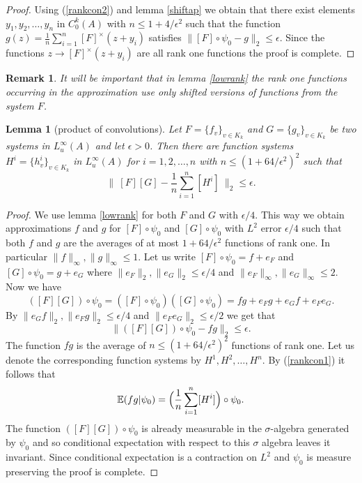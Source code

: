 \documentclass [11pt] {article}
\newtheorem{lemma}{Lemma}[section]
\newtheorem{remark}{Remark}[section]
\begin{document}
\begin{proof} Using (\ref{rankcon2}) and lemma \ref{shiftap} we obtain that there exist elements $y_1,y_2,\dots,y_n$ in $C^k_0(A)$ with $n\leq 1+4/\epsilon^2$ such that the function $g(z)=\frac{1}{n}\sum_{i=1}^n [F]^\times(z+y_i)$ satisfies $\|[F]\circ\psi_0-g\|_2\leq\epsilon$. Since the functions $z\rightarrow [F]^\times(z+y_i)$ are all rank one functions the proof is complete. 
\end{proof}

\begin{remark}\label{aptrans} It will be important that in lemma \ref{lowrank} the rank one functions occurring in the approximation use only shifted versions of functions from the system $F$.
\end{remark}

\begin{lemma}[product of convolutions]\label{prodconv} Let $F=\{f_v\}_{v\in K_k}$ and $G=\{g_v\}_{v\in K_k}$ be two systems in $L^\infty_u(A)$ and let $\epsilon>0$. Then there are function systems $H^i=\{h_v^i\}_{v\in K_k}$ in $L^\infty_u(A)$ for $i=1,2,\dots,n$ with $n\leq (1+64/\epsilon^2)^2$ such that 
$$\|~[F][G]-\frac{1}{n}\sum_{i=1}^n[H^i]~\|_2\leq\epsilon.$$
\end{lemma}

\begin{proof} We use lemma \ref{lowrank} for both $F$ and $G$ with $\epsilon/4$. This way we obtain approximations $f$ and $g$ for $[F]\circ\psi_0$ and $[G]\circ\psi_0$ with $L^2$ error $\epsilon/4$ such that both $f$ and $g$ are the averages of at most $1+64/\epsilon^2$ functions of rank one. In particular $\|f\|_\infty,\|g\|_\infty\leq 1$.  
Let us write $[F]\circ\psi_0=f+e_F$ and $[G]\circ\psi_0=g+e_G$ where $\|e_F\|_2,\|e_G\|_2\leq\epsilon/4$ and $\|e_F\|_\infty,\|e_G\|_\infty\leq 2$. Now we have 
$$([F][G])\circ\psi_0=([F]\circ\psi_0)([G]\circ\psi_0)=fg+e_Fg+e_Gf+e_Fe_G.$$ By
$\|e_Gf\|_2,\|e_Fg\|_2\leq\epsilon/4$ and $\|e_Fe_G\|_2\leq\epsilon/2$ we get that $$\|([F][G])\circ\psi_0-fg\|_2\leq\epsilon.$$ The function $fg$ is the average of $n\leq (1+64/\epsilon^2)^2$ functions of rank one. Let us denote the corresponding function systems by $H^1,H^2,\dots,H^n$. By (\ref{rankcon1}) it follows  that $$\mathbb{E}(fg|\psi_0)=\Bigl(\frac{1}{n}\sum_{i=1}^n[H^i]\Bigr)\circ\psi_0.$$ The function $([F][G])\circ\psi_0$ is already measurable in the $\sigma$-algebra generated by $\psi_0$ and so conditional expectation with respect to this $\sigma$ algebra leaves it invariant. Since conditional expectation is a contraction on $L^2$ and $\psi_0$ is measure preserving the proof is complete.
\end{proof}
\end{document}
